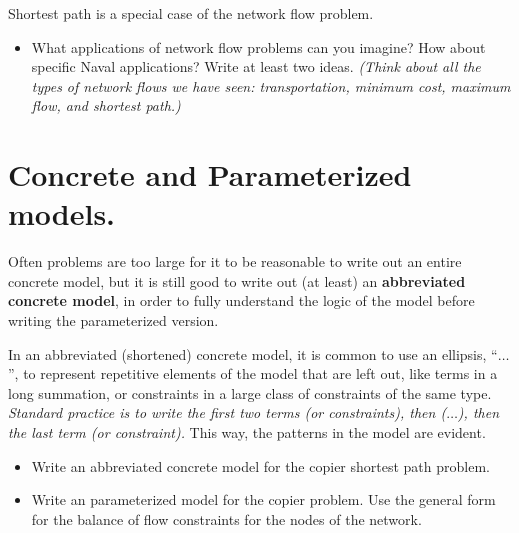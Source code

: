 \documentclass[11pt]{article}
\theoremstyle{definition}
\newcommand{\answerbox}[3]{%
  \fbox{%
    \begin{minipage}[#1]{#2}
      \hfill\vspace{#3}
    \end{minipage}
  }
}
\newcommand{\answerboxone}[2]{%
  \answerbox{#1}{6.0in}{#2} 
}
\newcommand{\wordbox}{\answerbox{c}{1.2in}{.7cm}}
\newcommand{\catbox}{\answerbox{c}{.5in}{.7cm}}
\begin{document}
\begin{tcolorbox}
Shortest path is a special case of the \wordbox \catbox network flow problem.
\end{tcolorbox}

\begin{itemize}
\item What applications of network flow problems can you imagine? How about specific Naval applications?  Write  at least two ideas.  \emph{(Think about all the types of network flows we have seen: transportation, minimum cost, maximum flow, and shortest path.)}

\answerboxone{c}{1 in}
\end{itemize}

\newpage
\section{Concrete and Parameterized models.}

Often problems are too large for it to be reasonable to write out an entire concrete model, but it is still good to write out (at least) an \textbf{abbreviated concrete model}, in order to fully understand the logic of the model before writing the parameterized version. 

In an abbreviated (shortened) concrete model, it is common to use an ellipsis, ``$\dots$'', to represent repetitive elements of the model that are left out, like terms in a long summation, or constraints in a large class of constraints of the same type.  \emph{Standard practice is to write the first two terms (or constraints), then ($\dots$), then the last term (or constraint).}  This way, the patterns in the model are evident.

\begin{itemize}
\item Write an abbreviated concrete model for the copier shortest path problem. \\  \answerboxone{c}{4.5in}
\newpage
\item Write an parameterized model for the copier problem.  Use the general form for the balance of flow constraints for the nodes of the network.\\  \answerboxone{c}{4.45 in}
\end{itemize}
\end{document}
